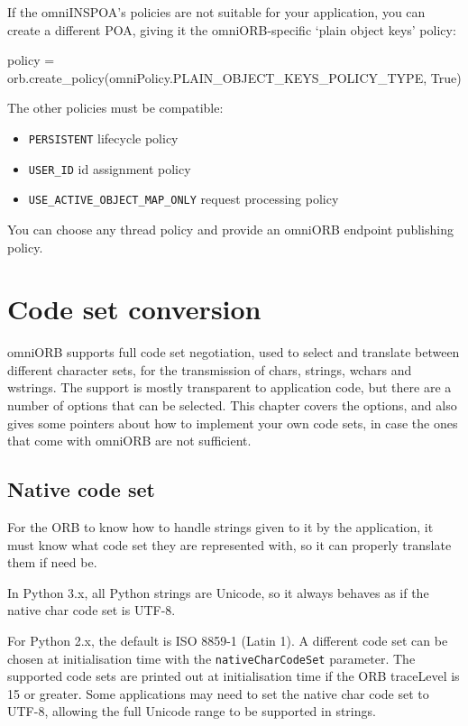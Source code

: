 \documentclass[11pt,oneside,a4paper]{book}
\newcommand{\code}[1]{\texttt{#1}}
\begin{document}
If the omniINSPOA's policies are not suitable for your application,
you can create a different POA, giving it the omniORB-specific `plain
object keys' policy:

\begin{pylisting}
policy = orb.create_policy(omniPolicy.PLAIN_OBJECT_KEYS_POLICY_TYPE, True)
\end{pylisting}

\noindent The other policies must be compatible:

\begin{itemize}
\item \code{PERSISTENT} lifecycle policy
\item \code{USER\_ID} id assignment policy
\item \code{USE\_ACTIVE\_OBJECT\_MAP\_ONLY} request processing policy
\end{itemize}

\noindent You can choose any thread policy and provide an omniORB
endpoint publishing policy.



\chapter{Code set conversion}
\label{chap:codesets}

omniORB supports full code set negotiation, used to select and
translate between different character sets, for the transmission of
chars, strings, wchars and wstrings. The support is mostly transparent
to application code, but there are a number of options that can be
selected. This chapter covers the options, and also gives some
pointers about how to implement your own code sets, in case the ones
that come with omniORB are not sufficient.


\section{Native code set}

For the ORB to know how to handle strings given to it by the
application, it must know what code set they are represented with, so
it can properly translate them if need be.

In Python 3.x, all Python strings are Unicode, so it always behaves as
if the native char code set is UTF-8.

For Python 2.x, the default is ISO 8859-1 (Latin 1). A different code
set can be chosen at initialisation time with the
\code{nativeCharCodeSet} parameter. The supported code sets are
printed out at initialisation time if the ORB traceLevel is 15 or
greater. Some applications may need to set the native char code set to
UTF-8, allowing the full Unicode range to be supported in strings.
\end{document}

